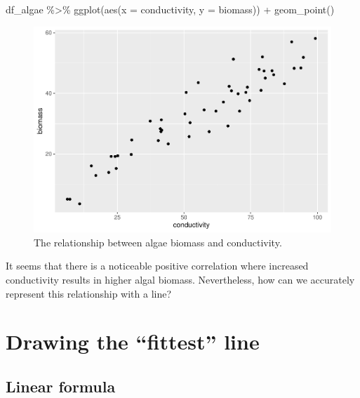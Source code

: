 \documentclass[
]{book}
\newenvironment{Shaded}{\begin{snugshade}}{\end{snugshade}}
\newcommand{\AttributeTok}[1]{\textcolor[rgb]{0.77,0.63,0.00}{#1}}
\newcommand{\FunctionTok}[1]{\textcolor[rgb]{0.00,0.00,0.00}{#1}}
\newcommand{\NormalTok}[1]{#1}
\newcommand{\SpecialCharTok}[1]{\textcolor[rgb]{0.00,0.00,0.00}{#1}}
\begin{document}
\begin{Shaded}
\begin{Highlighting}[]
\NormalTok{df\_algae }\SpecialCharTok{\%\textgreater{}\%} 
  \FunctionTok{ggplot}\NormalTok{(}\FunctionTok{aes}\NormalTok{(}\AttributeTok{x =}\NormalTok{ conductivity,}
             \AttributeTok{y =}\NormalTok{ biomass)) }\SpecialCharTok{+}
  \FunctionTok{geom\_point}\NormalTok{()}
\end{Highlighting}
\end{Shaded}

\begin{figure}

{\centering \includegraphics{biostats_files/figure-latex/scatter-1} 

}

\caption{The relationship between algae biomass and conductivity.}\label{fig:scatter}
\end{figure}

It seems that there is a noticeable positive correlation where increased conductivity results in higher algal biomass. Nevertheless, how can we accurately represent this relationship with a line?

\hypertarget{drawing-the-fittest-line}{%
\section{Drawing the ``fittest'' line}\label{drawing-the-fittest-line}}

\hypertarget{linear-formula}{%
\subsection{Linear formula}\label{linear-formula}}
\end{document}
